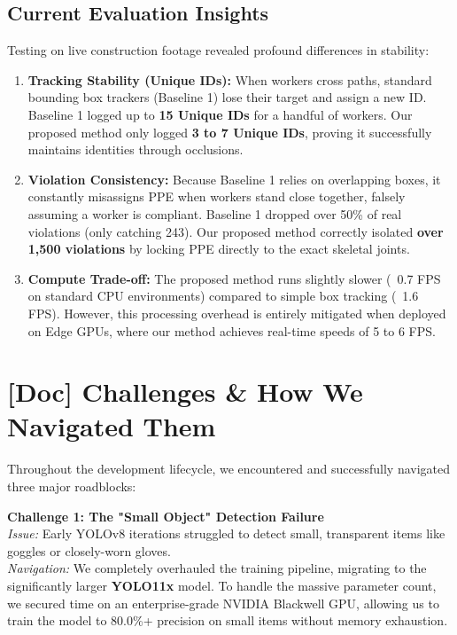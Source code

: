 \documentclass[12pt,a4paper]{article}
\begin{document}
\subsection{Current Evaluation Insights}
Testing on live construction footage revealed profound differences in stability:

\begin{enumerate}
    \item \textbf{Tracking Stability (Unique IDs):} When workers cross paths, standard bounding box trackers (Baseline 1) lose their target and assign a new ID. Baseline 1 logged up to \textbf{15 Unique IDs} for a handful of workers. Our proposed method only logged \textbf{3 to 7 Unique IDs}, proving it successfully maintains identities through occlusions.
    \item \textbf{Violation Consistency:} Because Baseline 1 relies on overlapping boxes, it constantly misassigns PPE when workers stand close together, falsely assuming a worker is compliant. Baseline 1 dropped over 50\% of real violations (only catching 243). Our proposed method correctly isolated \textbf{over 1,500 violations} by locking PPE directly to the exact skeletal joints.
    \item \textbf{Compute Trade-off:} The proposed method runs slightly slower (~0.7 FPS on standard CPU environments) compared to simple box tracking (~1.6 FPS). However, this processing overhead is entirely mitigated when deployed on Edge GPUs, where our method achieves real-time speeds of 5 to 6 FPS.
\end{enumerate}

\section{[Doc] Challenges \& How We Navigated Them}

Throughout the development lifecycle, we encountered and successfully navigated three major roadblocks:

\textbf{Challenge 1: The "Small Object" Detection Failure}\\
\textit{Issue:} Early YOLOv8 iterations struggled to detect small, transparent items like goggles or closely-worn gloves.\\
\textit{Navigation:} We completely overhauled the training pipeline, migrating to the significantly larger \textbf{YOLO11x} model. To handle the massive parameter count, we secured time on an enterprise-grade NVIDIA Blackwell GPU, allowing us to train the model to 80.0\%+ precision on small items without memory exhaustion.
\end{document}
